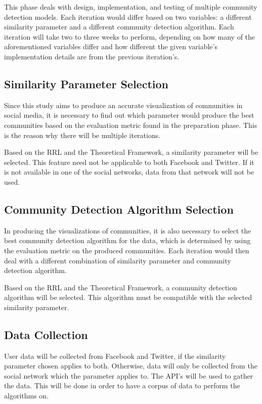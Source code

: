 This phase deals with design, implementation, and testing of multiple community detection models. Each iteration would differ based on two variables: a different similarity parameter and a different community detection algorithm. Each iteration will take two to three weeks to perform, depending on how many of the aforementioned variables differ and how different the given variable’s implementation details are from the previous iteration’s.

\subsection{Similarity Parameter Selection}

Since this study aims to produce an accurate visualization of communities in social media, it is necessary to find out which parameter would produce the best communities based on the evaluation metric found in the preparation phase. This is the reason why there will be multiple iterations. 

Based on the RRL and the Theoretical Framework, a similarity parameter will be selected. This feature need not be applicable to both Facebook and Twitter. If it is not available in one of the social networks, data from that network will not be used.

\subsection{Community Detection Algorithm Selection}

In producing the visualizations of communities, it is also necessary to select the best community detection algorithm for the data, which is determined by using the evaluation metric on the produced communities. Each iteration would then deal with a different combination of similarity parameter and community detection algorithm.

Based on the RRL and the Theoretical Framework, a community detection algorithm will be selected. This algorithm must be compatible with the selected similarity parameter.

\subsection{Data Collection}

User data will be collected from Facebook and Twitter, if the similarity parameter chosen applies to both. Otherwise, data will only be collected from the social network which the parameter applies to. The API’s will be used to gather the data. This will be done in order to have a corpus of data to perform the algorithms on.

